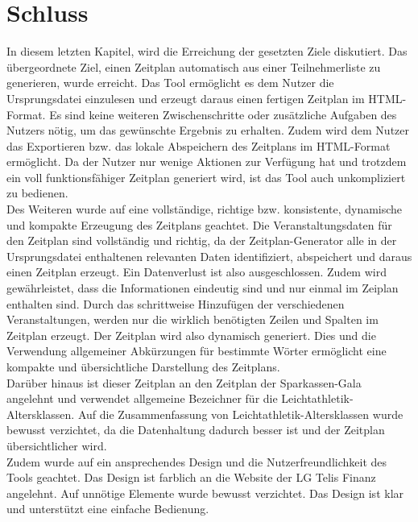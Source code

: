 
\chapter{Schluss}
\label{chap:Schluss}

In diesem letzten Kapitel, wird die Erreichung der gesetzten Ziele diskutiert.
Das übergeordnete Ziel, einen Zeitplan automatisch aus einer Teilnehmerliste zu generieren, wurde erreicht. Das Tool ermöglicht es dem Nutzer die Ursprungsdatei einzulesen und erzeugt daraus einen fertigen Zeitplan im HTML-Format. Es sind keine weiteren Zwischenschritte oder zusätzliche Aufgaben des Nutzers nötig, um das gewünschte Ergebnis zu erhalten. Zudem wird dem Nutzer das Exportieren bzw. das lokale Abspeichern des Zeitplans im HTML-Format ermöglicht. Da der Nutzer nur wenige Aktionen zur Verfügung hat und trotzdem ein voll funktionsfähiger Zeitplan generiert wird, ist das Tool auch unkompliziert zu bedienen.\\
Des Weiteren wurde auf eine vollständige, richtige bzw. konsistente, dynamische und kompakte Erzeugung des Zeitplans geachtet. Die Veranstaltungsdaten für den Zeitplan sind vollständig und richtig, da der Zeitplan-Generator alle in der Ursprungsdatei enthaltenen relevanten Daten identifiziert, abspeichert und daraus einen Zeitplan erzeugt. Ein Datenverlust ist also ausgeschlossen. Zudem wird gewährleistet, dass die Informationen eindeutig sind und nur einmal im Zeiplan enthalten sind. Durch das schrittweise Hinzufügen der verschiedenen Veranstaltungen, werden nur die wirklich benötigten Zeilen und Spalten im Zeitplan erzeugt. Der Zeitplan wird also dynamisch generiert. Dies und die Verwendung allgemeiner Abkürzungen für bestimmte Wörter ermöglicht eine kompakte und übersichtliche Darstellung des Zeitplans.\\
Darüber hinaus ist dieser Zeitplan an den Zeitplan der Sparkassen-Gala angelehnt und verwendet allgemeine Bezeichner für die Leichtathletik-Altersklassen. Auf die Zusammenfassung von Leichtathletik-Altersklassen wurde bewusst verzichtet, da die Datenhaltung dadurch besser ist und der Zeitplan übersichtlicher wird.\\
Zudem wurde auf ein ansprechendes Design und die Nutzerfreundlichkeit des Tools geachtet. Das Design ist farblich an die Website der LG Telis Finanz angelehnt. Auf unnötige Elemente wurde bewusst verzichtet. Das Design ist klar und unterstützt eine einfache Bedienung.\\
